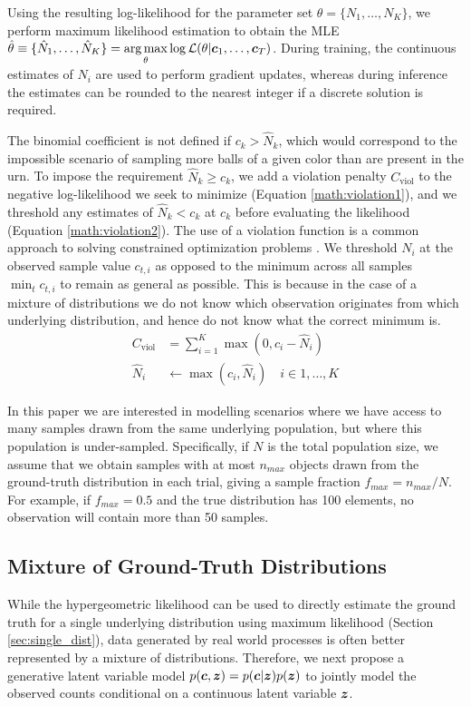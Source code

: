 \documentclass{article}
\theoremstyle{plain}
\theoremstyle{definition}
\theoremstyle{remark}
\begin{document}
Using the resulting log-likelihood for the parameter set $\theta = \{ N_1,\ldots,N_K \}$, we perform maximum likelihood estimation to obtain the MLE $\displaystyle \hat{\theta} \equiv \{ \hat{N}_1,\ldots,\hat{N}_K \} = \operatorname*{arg\,max}_\theta \log \mathcal{L}(\theta | {\bm{c}}_1,\ldots,{\bm{c}}_T)$. During training, the continuous estimates of $N_i$ are used to perform gradient updates, whereas during inference the estimates can be rounded to the nearest integer if a discrete solution is required.

The binomial coefficient is not defined if $c_k > \hat{N}_k$, which would correspond to the impossible scenario of sampling more balls of a given color than are present in the urn. To impose the requirement $\hat{N}_k \ge c_k$, we add a violation penalty $C_\text{viol}$ to the negative log-likelihood we seek to minimize (Equation \ref{math:violation1}), and we threshold any estimates of $\hat{N}_k < c_k$ at $c_k$ before evaluating the likelihood (Equation \ref{math:violation2}). The use of a violation function is a common approach to solving constrained optimization problems \cite{bertsekas2014constrained}. We threshold $N_i$ at the observed sample value $c_{t,i}$ as opposed to the minimum across all samples $\min_t c_{t,i}$ to remain as general as possible. This is because in the case of a mixture of distributions we do not know which observation originates from which underlying distribution, and hence do not know what the correct minimum is.
\begin{align}
    C_\text{viol} &= \sum_{i=1}^K \max(0, c_i - \hat{N}_i) \label{math:violation1} \\
    \hat{N}_i &\leftarrow \max(c_i, \hat{N}_i) \quad i \in 1, \ldots,K \label{math:violation2}
\end{align}

In this paper we are interested in modelling scenarios where we have access to many samples drawn from the same underlying population, but where this population is under-sampled. Specifically, if $N$ is the total population size, we assume that we obtain samples with at most $n_{max}$ objects drawn from the ground-truth distribution in each trial, giving a sample fraction $f_{max} = n_{max}/N$. For example, if $f_{max}=0.5$ and the true distribution has 100 elements, no observation will contain more than 50 samples.

\subsection{Mixture of Ground-Truth Distributions}
While the hypergeometric likelihood can be used to directly estimate the ground truth for a single underlying distribution using maximum likelihood (Section \ref{sec:single_dist}), data generated by real world processes is often better represented by a mixture of distributions. Therefore, we next propose a generative latent variable model $p({\bm{c}},{\bm{z}}) = p({\bm{c}}|{\bm{z}})p({\bm{z}})$ to jointly model the observed counts conditional on a continuous latent variable ${\bm{z}}$.
\end{document}
